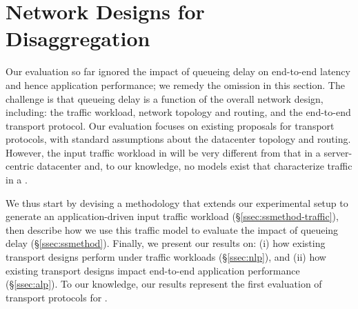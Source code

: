\section{Network Designs for Disaggregation}
%
%
\label{sec:existing}
Our evaluation so far ignored the impact of queueing delay on end-to-end latency and hence application performance; we remedy the omission in this section.
The challenge is that queueing delay is a function of the overall network design, including: the traffic workload, network topology and routing, and the end-to-end transport protocol. Our evaluation focuses on existing proposals for transport protocols, with standard assumptions about the datacenter topology and routing. However, the input traffic workload in \dis will be very different from that in a server-centric datacenter and, to our knowledge, no models exist that characterize traffic in a \dis. 

We thus start by devising a methodology that extends our experimental setup to generate an application-driven input traffic workload (\S\ref{ssec:ssmethod-traffic}), then describe how we use this traffic model to evaluate the impact of queueing delay (\S\ref{ssec:ssmethod}). Finally, we present our results on: (i) how existing transport designs perform under \dis traffic workloads (\S\ref{ssec:nlp}), and (ii) how existing transport designs impact end-to-end application performance (\S\ref{ssec:alp}). To our knowledge, our results represent the first evaluation of transport protocols for \dis. 

